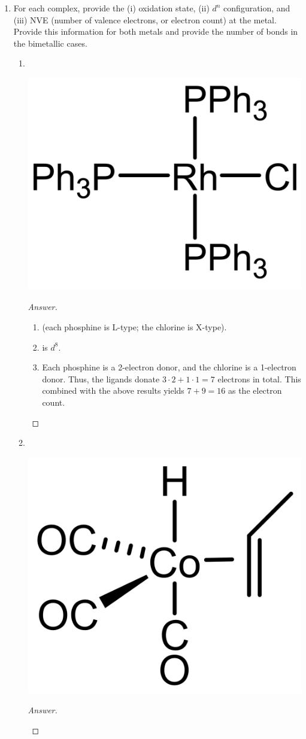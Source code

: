\documentclass[../psets.tex]{subfiles}
\begin{document}
\begin{enumerate}
    \item {}For each complex, provide the (i) oxidation state, (ii) $d^n$ configuration, and (iii) NVE (number of valence electrons, or electron count) at the metal. Provide this information for both metals and provide the number of  bonds in the bimetallic cases.
    \begin{enumerate}[label={\arabic*)}]
        \item ${\color{white}hi}$
        \begin{center}
            \includegraphics[width=0.2\linewidth]{../ExtFiles/pset1-1-01.png}
        \end{center}
        \begin{proof}[Answer]\leavevmode
            \begin{enumerate}[label={(\roman*)}]
                \item {} (each phosphine is L-type; the chlorine is X-type).
                \item {} is $d^8$.
                \item Each phosphine is a 2-electron donor, and the chlorine is a 1-electron donor. Thus, the ligands donate $3\cdot 2+1\cdot 1=7$ electrons in total. This combined with the above results yields $7+9=16$ as the electron count.
            \end{enumerate}
        \end{proof}
        \item ${\color{white}hi}$
        \begin{center}
            \includegraphics[width=0.2\linewidth]{../ExtFiles/pset1-1-02.png}
        \end{center}
        \begin{proof}[Answer]\leavevmode
            \begin{enumerate}[label={(\roman*)}]

\end{enumerate}
\end{proof}
\end{enumerate}
\end{enumerate}
\end{document}
